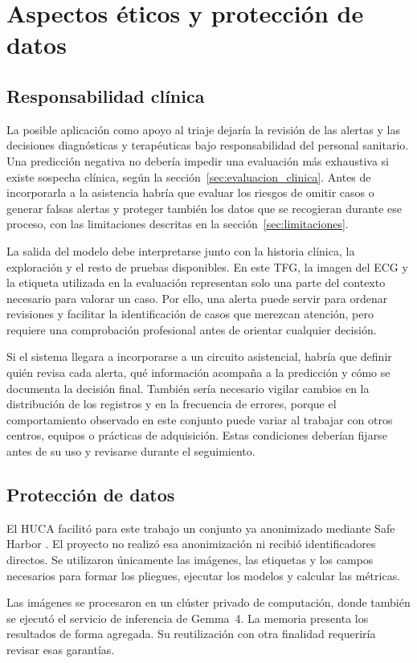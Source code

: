 \chapter{Aspectos éticos y protección de datos}
\label{chap:gestion_etica}

\section{Responsabilidad clínica}

La posible aplicación como apoyo al triaje dejaría la revisión de las alertas y las decisiones diagnósticas y terapéuticas bajo responsabilidad del personal sanitario. Una predicción negativa no debería impedir una evaluación más exhaustiva si existe sospecha clínica, según la sección~\ref{sec:evaluacion_clinica}. Antes de incorporarla a la asistencia habría que evaluar los riesgos de omitir casos o generar falsas alertas y proteger también los datos que se recogieran durante ese proceso, con las limitaciones descritas en la sección~\ref{sec:limitaciones}.

La salida del modelo debe interpretarse junto con la historia clínica, la exploración y el resto de pruebas disponibles. En este TFG, la imagen del ECG y la etiqueta utilizada en la evaluación representan solo una parte del contexto necesario para valorar un caso. Por ello, una alerta puede servir para ordenar revisiones y facilitar la identificación de casos que merezcan atención, pero requiere una comprobación profesional antes de orientar cualquier decisión.

Si el sistema llegara a incorporarse a un circuito asistencial, habría que definir quién revisa cada alerta, qué información acompaña a la predicción y cómo se documenta la decisión final. También sería necesario vigilar cambios en la distribución de los registros y en la frecuencia de errores, porque el comportamiento observado en este conjunto puede variar al trabajar con otros centros, equipos o prácticas de adquisición. Estas condiciones deberían fijarse antes de su uso y revisarse durante el seguimiento.

\section{Protección de datos}

El HUCA facilitó para este trabajo un conjunto ya anonimizado mediante Safe Harbor \cite{costacortez2026brugada}. El proyecto no realizó esa anonimización ni recibió identificadores directos. Se utilizaron únicamente las imágenes, las etiquetas y los campos necesarios para formar los pliegues, ejecutar los modelos y calcular las métricas.

Las imágenes se procesaron en un clúster privado de computación, donde también se ejecutó el servicio de inferencia de Gemma~4. La memoria presenta los resultados de forma agregada. Su reutilización con otra finalidad requeriría revisar esas garantías.
